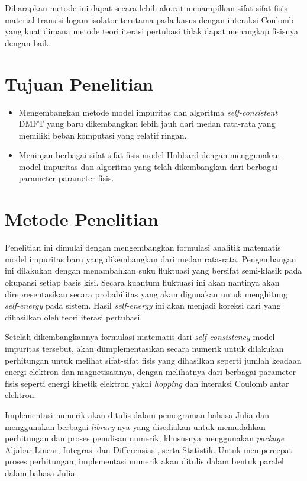 Diharapkan metode ini dapat secara lebih akurat menampilkan sifat-sifat fisis material transisi logam-isolator terutama pada kasus dengan interaksi Coulomb yang kuat dimana metode teori iterasi pertubasi tidak dapat menangkap fisisnya dengan baik.


\section{Tujuan Penelitian}
\begin{itemize}
\item Mengembangkan metode model impuritas dan algoritma \textit{self-consistent} DMFT yang baru dikembangkan lebih jauh dari medan rata-rata yang memiliki beban komputasi yang relatif ringan.
\item Meninjau berbagai sifat-sifat fisis model Hubbard  dengan menggunakan model impuritas dan algoritma yang telah dikembangkan dari berbagai parameter-parameter fisis.
\end{itemize}

\section{Metode Penelitian}
Penelitian ini dimulai dengan mengembangkan formulasi analitik matematis model impuritas baru yang dikembangkan dari medan rata-rata. Pengembangan ini dilakukan dengan menambahkan suku fluktuasi yang bersifat semi-klasik pada okupansi setiap basis kisi. Secara kuantum fluktuasi ini akan nantinya akan direpresentasikan secara probabilitas yang akan digunakan untuk menghitung \textit{self-energy} pada sistem. Hasil \textit{self-energy} ini akan menjadi koreksi dari yang dihasilkan oleh teori iterasi pertubasi. 

Setelah dikembangkannya formulasi matematis dari \textit{self-consistency} model impuritas tersebut, akan diimplementasikan secara numerik untuk dilakukan perhitungan untuk melihat sifat-sifat fisis yang dihasilkan seperti jumlah keadaan energi elektron dan magnetisasinya, dengan melihatnya dari berbagai parameter fisis seperti energi kinetik elektron yakni \textit{hopping} dan interaksi Coulomb antar elektron.

Implementasi numerik akan ditulis dalam pemograman bahasa Julia dan menggunakan berbagai \textit{library} nya yang disediakan untuk memudahkan perhitungan dan proses penulisan numerik, khususnya menggunakan \textit{package} Aljabar Linear, Integrasi dan Differensiasi, serta Statistik. Untuk mempercepat proses perhitungan, implementasi numerik akan ditulis dalam bentuk paralel dalam bahasa Julia.

